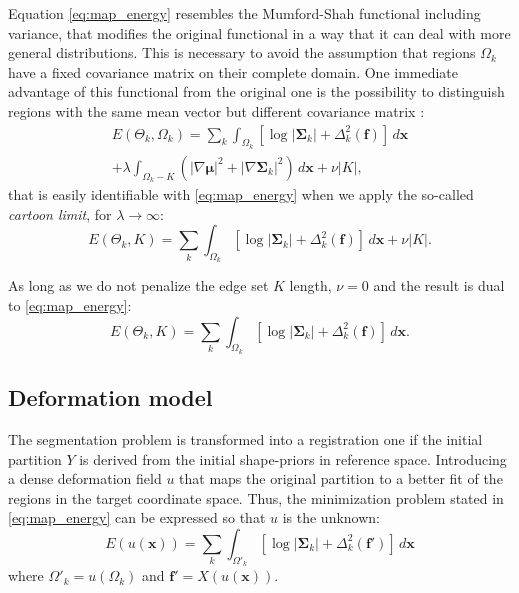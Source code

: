 Equation \eqref{eq:map_energy} resembles the Mumford-Shah functional including variance,
that modifies the original functional in a way that it can deal with more general
distributions. This is necessary to avoid the assumption that regions $\Omega_k$
have a fixed covariance matrix on their complete domain. One immediate advantage
of this functional from the original one is the possibility to distinguish regions
with the same mean vector but different covariance matrix \citep{brox_local_2009}:
\begin{multline}
E(\Theta_k,\Omega_k) = \sum\limits_k \int_{\Omega_k} \left[ \log \left|\mathbf{\Sigma}_k\right| + \Delta^2_k (\mathbf{f}) \right] \,d\mathbf{x} \\
+ \lambda \int_{\Omega_k - K}  ( \left| \nabla \mathbf{\mu} \right| ^2 + \left| \nabla \mathbf{\Sigma}_k \right| ^2 ) \, d\mathbf{x} 
+ \nu |K|,
\end{multline}
that is easily identifiable with \eqref{eq:map_energy} when we apply 
the so-called \emph{cartoon limit}, 
for $\lambda \to \infty$:
\begin{equation}
E(\Theta_k,K) = \sum\limits_k \int_{\Omega_k} \left[ \log \left|\mathbf{\Sigma}_k\right| + \Delta^2_k (\mathbf{f}) \right] \,d\mathbf{x}
+ \nu |K|.
\end{equation}

As long as we do not penalize the edge set $K$ length, $\nu = 0$ and
the result is dual to \eqref{eq:map_energy}:
\begin{equation}
E(\Theta_k,K) = \sum\limits_k \int_{\Omega_k} \left[ \log \left|\mathbf{\Sigma}_k\right| + \Delta^2_k (\mathbf{f}) \right] \,d\mathbf{x}.
\end{equation}


\subsection{Deformation model}
\label{sec:deformation}
%
The segmentation problem is transformed into a registration one if the initial
partition $Y$ is derived from the initial shape-priors in reference space. 
Introducing a dense deformation field $u$ that maps the original partition to
a better fit of the regions in the target coordinate space. Thus, the minimization
problem stated in \eqref{eq:map_energy} can be expressed so that $u$ is the 
unknown:
\begin{equation}
E(u(\mathbf{x})) = \sum\limits_k \int_{\Omega'_k} \left[ \log \left|\mathbf{\Sigma}_k\right| + \Delta^2_k (\mathbf{f'}) \right] \,d\mathbf{x}
\label{eq:map_energy_deformation}
\end{equation}
where $\Omega'_k = u(\Omega_k)$ and $\mathbf{f'} = X(u(\mathbf{x}))$.



